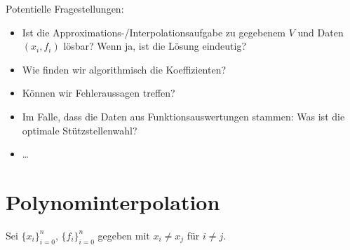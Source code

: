 \documentclass[11pt]{scrbook}
\begin{document}
Potentielle Fragestellungen:
\begin{itemize}
	\item 
		Ist die Approximations-/Interpolationsaufgabe zu gegebenem $V$ und Daten $(x_i,f_i)$ lösbar?
		Wenn ja, ist die Lösung eindeutig?
	\item
		Wie finden wir algorithmisch die Koeffizienten?
	\item
		Können wir Fehleraussagen treffen?
	\item
		Im Falle, dass die Daten aus Funktionsauswertungen stammen:
		Was ist die optimale Stützstellenwahl?
	\item
		\dots
\end{itemize}


\section{Polynominterpolation}

Sei $\{x_i\}_{i=0}^n$, $\{f_i\}_{i=0}^n$ gegeben mit $x_i\neq x_j$ für $i\neq j$.
\end{document}
